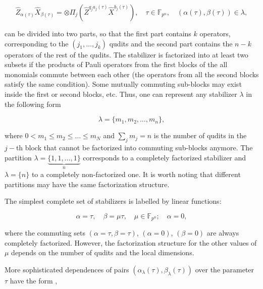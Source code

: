 \documentclass[quantumrep,article,submit,pdftex,moreauthors]{Definitions/mdpi}
\begin{document}
\begin{equation*}
  \hat{Z}_{\alpha(\tau)}\hat{X}_{\beta(\tau)}
  = \otimes \Pi_{j} \left(
    \hat{Z}^{q_{j}a_{j}(\tau)}\hat{X}^{b_{j}(\tau)}
  \right),
  \quad \tau \in \mathbb{F}_{p^{n}},
  \quad \left(\alpha(\tau),\beta(\tau)\right) \in \lambda,
\end{equation*}

can be divided into two parts, so that the first part contains $k$ operators,
corresponding to the $(j_{1},\ldots,j_{k})$ qudits and the second part contains
the $n-k$ operators of the rest of the qudits. The stabilizer is factorized into
at least two subsets if the products of Pauli operators from the first blocks of
the all monomials commute between each other (the operators from all the second
blocks satisfy the same condition).  Some mutually commuting sub-blocks may
exist inside the first or second blocks, etc. Thus, one can represent any
stabilizer $\lambda$ in the following form

\begin{equation}
  \lambda = \{m_{1},m_{2},\ldots,m_{n}\},
  \label{curve_part}
\end{equation}

where $0<m_{1}\leq m_{2} \leq \ldots \leq m_{N}$ and $\sum_{j}m_{j}=n$ is the
number of qudits in the $j-$th block that cannot be factorized into commuting
sub-blocks anymore. The partition $\lambda =\underbrace{\{1,1,\ldots,1\}}_{n}$
corresponds to a completely factorized stabilizer and $\lambda=\{n\}$ to a
completely non-factorized one. It is worth noting that different partitions
may
 have the same factorization structure.

The simplest complete set of stabilizers is labelled by linear functions:

\begin{equation}
  \alpha = \tau, \quad \beta = \mu \tau, \quad \mu \in \mathbb{F}_{p^{n}};
  \quad \alpha = 0,
  \label{rays}
\end{equation}

where the commuting sets $\left(\alpha = \tau, \beta = \tau \right)$,
$\left(\alpha = 0\right)$, $\left(\beta = 0\right)$ are always completely
factorized.  However, the factorization structure for the other values of
$\mu$
 depends on the number of qudits and the local dimensions.

More sophisticated dependences of pairs
$\left(\alpha_{\lambda}(\tau),\beta_{\lambda }(\tau)\right)$ over the parameter
$\tau$ have the form \cite{GS2,JPA09},
\end{document}
